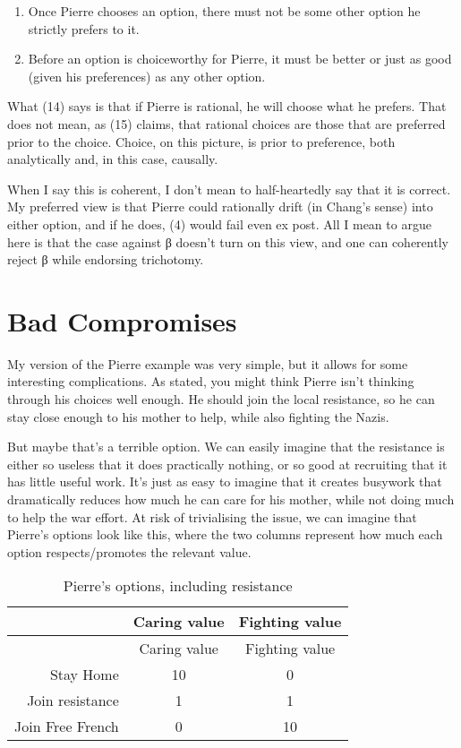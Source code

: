 \documentclass[
  11pt,
  letterpaper,
  DIV=11,
  numbers=noendperiod,
  twoside]{scrartcl}
\providecommand{\tightlist}{%
  \setlength{\itemsep}{0pt}\setlength{\parskip}{0pt}}
\begin{document}
\begin{enumerate}
\def\labelenumi{(\arabic{enumi})}
\setcounter{enumi}{13}
\tightlist
\item
  Once Pierre chooses an option, there must not be some other option he
  strictly prefers to it.
\item
  Before an option is choiceworthy for Pierre, it must be better or just
  as good (given his preferences) as any other option.
\end{enumerate}

What (14) says is that if Pierre is rational, he will choose what he
prefers. That does not mean, as (15) claims, that rational choices are
those that are preferred prior to the choice. Choice, on this picture,
is prior to preference, both analytically and, in this case, causally.

When I say this is coherent, I don't mean to half-heartedly say that it
is correct. My preferred view is that Pierre could rationally drift (in
Chang's sense) into either option, and if he does, (4) would fail even
ex post. All I mean to argue here is that the case against β doesn't
turn on this view, and one can coherently reject β while endorsing
trichotomy.

\section{Bad Compromises}\label{sec-badcomp}

My version of the Pierre example was very simple, but it allows for some
interesting complications. As stated, you might think Pierre isn't
thinking through his choices well enough. He should join the local
resistance, so he can stay close enough to his mother to help, while
also fighting the Nazis.

But maybe that's a terrible option. We can easily imagine that the
resistance is either so useless that it does practically nothing, or so
good at recruiting that it has little useful work. It's just as easy to
imagine that it creates busywork that dramatically reduces how much he
can care for his mother, while not doing much to help the war effort. At
risk of trivialising the issue, we can imagine that Pierre's options
look like this, where the two columns represent how much each option
respects/promotes the relevant value.

\begin{longtable}[]{@{}rcc@{}}
\caption{Pierre's options, including
resistance}\label{tbl-pierreresist}\tabularnewline
\toprule\noalign{}
& Caring value & Fighting value \\
\midrule\noalign{}
\endfirsthead
\toprule\noalign{}
& Caring value & Fighting value \\
\midrule\noalign{}
\endhead
\bottomrule\noalign{}
\endlastfoot
Stay Home & 10 & 0 \\
Join resistance & 1 & 1 \\
Join Free French & 0 & 10 \\
\end{longtable}
\end{document}
